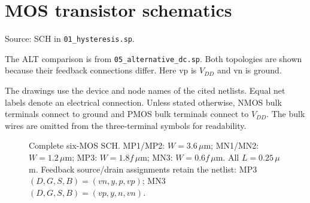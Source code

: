 \clearpage\section{MOS transistor schematics}
Source: SCH in \texttt{01\_hysteresis.sp}.\par
The ALT comparison is from \texttt{05\_alternative\_dc.sp}. Both topologies are shown because their feedback connections differ. Here vp is $V_{DD}$ and vn is ground.

The drawings use the device and node names of the cited netlists. Equal net labels denote an electrical connection. Unless stated otherwise, NMOS bulk terminals connect to ground and PMOS bulk terminals connect to $V_{DD}$. The bulk wires are omitted from the three-terminal symbols for readability.
\begin{figure}[!htbp]\centering
{}
\caption{Complete six-MOS SCH. MP1/MP2: $W=3.6\,\mu$m; MN1/MN2: $W=1.2\,\mu$m; MP3: $W=1.8f\,\mu$m; MN3: $W=0.6f\,\mu$m. All $L=0.25\,\mu$m. Feedback source/drain assignments retain the netlist: MP3 $(D,G,S,B)=(vn,y,p,vp)$; MN3 $(D,G,S,B)=(vp,y,n,vn)$.}
\end{figure}

